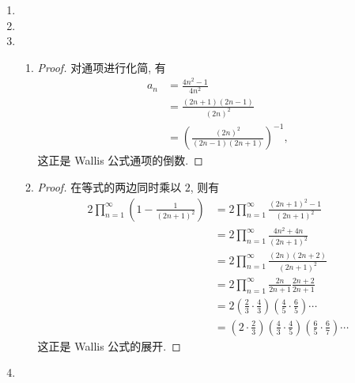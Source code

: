 % 
\begin{enumerate}
    \item %
    \item %
    \item %
        \begin{enumerate}[(1)]
            \item %
                \begin{proof}
                    对通项进行化简, 有
                    \begin{align*}
                        a_n &= \frac{4n^2 - 1}{4n^2} \\
                        &= \frac{(2n+1)(2n-1)}{(2n)^2} \\
                        &= \left(\frac{(2n)^2}{(2n-1)(2n+1)}\right)^{-1},
                    \end{align*}
                    这正是 Wallis 公式通项的倒数.
                \end{proof}
            \item %
                \begin{proof}
                    在等式的两边同时乘以 $2$, 则有
                    \begin{align*}
                        2\prod_{n=1}^\infty\left(1-\frac{1}{(2n+1)^2}\right) &= 2\prod_{n=1}^\infty\frac{(2n+1)^2-1}{(2n+1)^2} \\
                        &= 2\prod_{n=1}^\infty\frac{4n^2+4n}{(2n+1)^2} \\
                        &= 2\prod_{n=1}^\infty\frac{(2n)(2n+2)}{(2n+1)^2} \\
                        &= 2\prod_{n=1}^\infty\frac{2n}{2n+1}\frac{2n+2}{2n+1} \\
                        &= 2\left(\frac23\cdot\frac43\right)\left(\frac45\cdot\frac65\right)\cdots \\
                        &= \left(2\cdot\frac23\right)\left(\frac43\cdot\frac45\right)\left(\frac65\cdot\frac67\right)\cdots
                    \end{align*}
                    这正是 Wallis 公式的展开.
                \end{proof}
        \end{enumerate}
    \item %

\end{enumerate}
